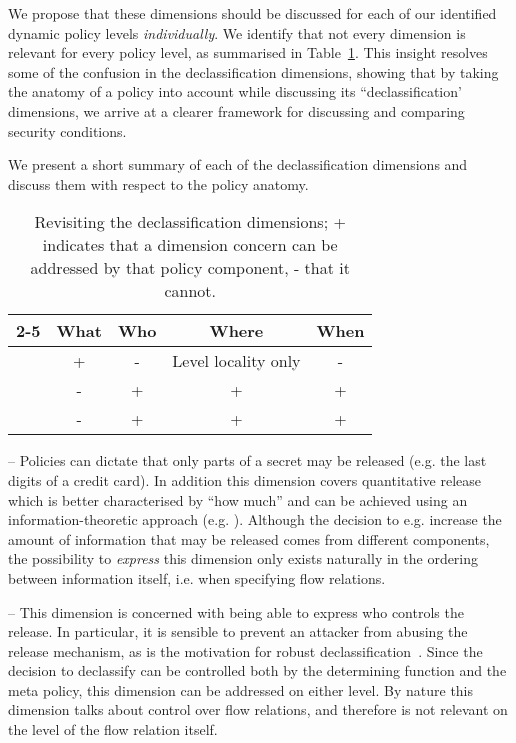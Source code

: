 We propose that these dimensions should be discussed for each of our identified dynamic policy levels 
\emph{individually}. We identify that not every dimension is relevant for every policy level, as 
summarised in Table~\ref{tbl:decldimensions}.
This insight resolves some of the confusion in the declassification dimensions,
showing that by taking the anatomy of a policy into account while discussing its 
``declassification' dimensions, we arrive at a clearer framework for discussing and comparing 
security conditions.

We present a short summary of each of the declassification dimensions and discuss them with respect to the policy anatomy.

\begin{table}
\begin{center}
  \begin{tabular}{@{}|l|*{4}{c}|@{}}
    \cline{2-5}
    \multicolumn{1}{ c|  }{} & What & Who & Where & When \\ 
    \hline
    \orderings{} & + & - &  Level locality only & - \\
    \dynamicpol{} & - & + & + & + \\
    \metapol{} & - & + & + & + \\ \hline
  \end{tabular}
\end{center}
\vspace*{0.7ex}
\caption{Revisiting the declassification dimensions; + indicates that a dimension concern can be addressed by that policy component, - that it cannot.}
\label{tbl:decldimensions}
\end{table}

 -- 
Policies can dictate that only parts of a secret may be released (e.g. the last digits of a credit card). 
In addition this dimension covers quantitative release which is better characterised by ``how much'' and can be achieved using an information-theoretic approach (e.g. \cite{Clark+:ENTCS}).
Although the decision to e.g. increase the amount of information that may be released comes from different components, the possibility to \emph{express} this dimension only exists naturally in the ordering between information itself, i.e.
when specifying flow relations.


 -- 
This dimension is concerned with being able to express who controls the release.
In particular, it is sensible to prevent an attacker from abusing the release mechanism, 
as is the motivation for robust declassification~\cite{Zdancewic:Myers:CSFW01}.
Since the decision to declassify can be controlled both by the determining function 
and the meta policy, this dimension can be addressed on either level.
By nature this dimension talks about control over flow relations, and therefore 
is not relevant on the level of the flow relation itself.


